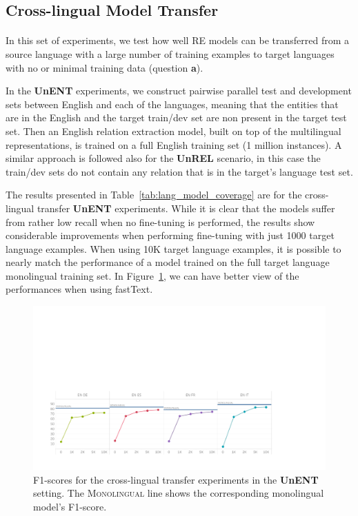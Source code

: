 \newpage
\subsection{Cross-lingual Model Transfer}
\paragraph{}
In this set of experiments, we test how well RE models can be transferred from a source language with a large number of training examples to target languages with no or minimal training data (question \textbf{a}). 

In the \textbf{UnENT} experiments, we construct pairwise parallel test and development sets between English and each of the languages, meaning that the entities that are in the English and the target train/dev set are non present in the target test set. Then an English relation extraction model, built  on  top  of  the  multilingual representations, is trained on a full English training set (1 million instances). A similar approach is followed also for the \textbf{UnREL} scenario, in this case the train/dev sets do not contain any relation that is in the target's language test set.

The results presented in Table~\ref{tab:lang_model_coverage} are for the cross-lingual transfer \textbf{UnENT} experiments. While it is clear that the models suffer from rather low recall when no fine-tuning is performed,  the  results  show considerable  improvements when performing fine-tuning with just 1000 target language examples. When using 10K target language examples, it is possible to nearly match the performance of a model trained on the full target language monolingual training set. In Figure~\ref{fig:UnEntF1}, we can have better view of the performances when using fastText.

\begin{figure}[h!]
\centering
\includegraphics[width=\textwidth]{images/UnENT_color_fixed.pdf}
\caption{F1-scores for the cross-lingual transfer experiments in the \textbf{UnENT} setting. The \textsc{Monolingual} line shows the corresponding monolingual model's F1-score.}
\label{fig:UnEntF1}
\end{figure} 


